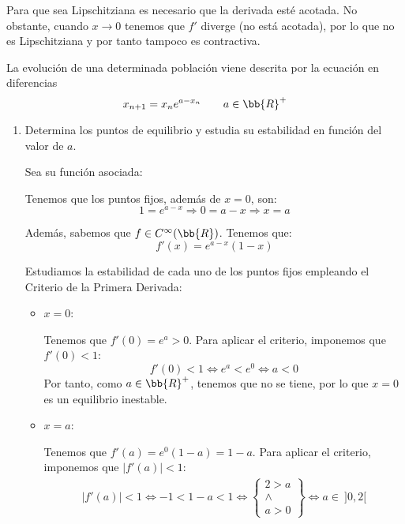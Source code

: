 \begin{ejercicio}
    Para que sea Lipschitziana es necesario que la derivada esté acotada. No obstante, cuando $x\to 0$ tenemos que $f'$ diverge (no está acotada), por lo que no es Lipschitziana y por tanto tampoco es contractiva.
\end{ejercicio}



\begin{ejercicio}
    La evolución de una determinada población viene descrita por la ecuación en diferencias
    \begin{equation*}
        x_{n+1} = x_ne^{a-x_n} \qquad a\in \bb{R}^+
    \end{equation*}
    \begin{enumerate}
        \item Determina los puntos de equilibrio y estudia su estabilidad en función del valor de $a$.

        Sea su función asociada:

        Tenemos que los puntos fijos, además de $x=0$, son:
        \begin{equation*}
            1 = e^{a-x} \Longrightarrow 0 = a-x \Longrightarrow x=a
        \end{equation*}

        Además, sabemos que $f\in C^\infty(\bb{R})$. Tenemos que:
        \begin{equation*}
            f'(x) = e^{a-x}(1-x)
        \end{equation*}

        Estudiamos la estabilidad de cada uno de los puntos fijos empleando el Criterio de la Primera Derivada:
        \begin{itemize}
            \item \ul{$x=0$}:

            Tenemos que $f'(0)=e^a>0$. Para aplicar el criterio, imponemos que $f'(0)<1$:
            \begin{equation*}
                f'(0)<1 \Longleftrightarrow e^a<e^0 \Longleftrightarrow
                a<0
            \end{equation*}
            Por tanto, como $a\in \bb{R}^+$, tenemos que no se tiene, por lo que $x=0$ es un equilibrio inestable.

            \item \ul{$x=a$}:

            Tenemos que $f'(a)=e^0(1-a)=1-a$. Para aplicar el criterio, imponemos que $|f'(a)|<1$:
            \begin{align*}
                |f'(a)|<1 \Longleftrightarrow
                -1 < 1-a < 1 \Longleftrightarrow
                \left\{\begin{array}{c}
                    2 > a\\\land \\ a>0
                \end{array}\right\} \Longleftrightarrow
                a \in~]0,2[
            \end{align*}
            

\end{itemize}
\end{enumerate}
\end{ejercicio}
